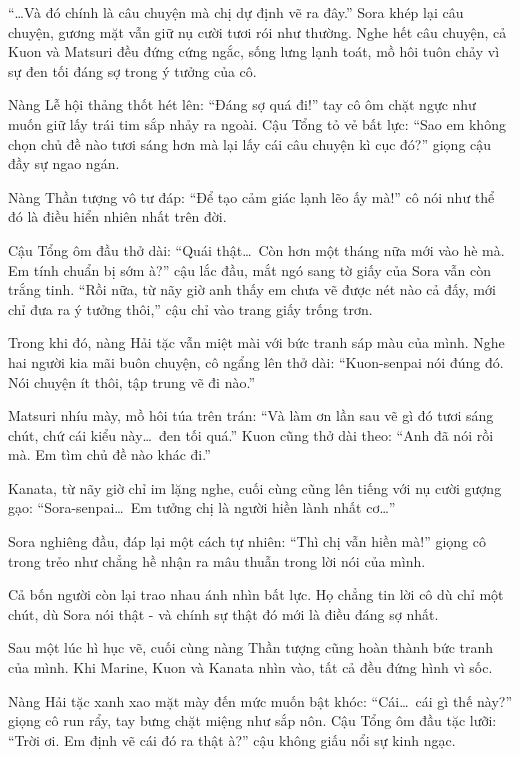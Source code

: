 \documentclass[../main.tex]{subfiles}
\begin{document}
``\dots Và đó chính là câu chuyện mà chị dự định vẽ ra đây.'' Sora khép lại câu chuyện, gương mặt vẫn giữ nụ cười tươi rói như thường. Nghe hết câu chuyện, cả Kuon và Matsuri đều đứng cứng ngắc, sống lưng lạnh toát, mồ hôi tuôn chảy vì sự đen tối đáng sợ trong ý tưởng của cô.

Nàng Lễ hội thảng thốt hét lên: ``Đáng sợ quá đi!'' tay cô ôm chặt ngực như muốn giữ lấy trái tim sắp nhảy ra ngoài. Cậu Tổng tỏ vẻ bất lực: ``Sao em không chọn chủ đề nào tươi sáng hơn mà lại lấy cái câu chuyện kì cục đó?'' giọng cậu đầy sự ngao ngán.

Nàng Thần tượng vô tư đáp: ``Để tạo cảm giác lạnh lẽo ấy mà!'' cô nói như thể đó là điều hiển nhiên nhất trên đời.

Cậu Tổng ôm đầu thở dài: ``Quái thật\dots\ Còn hơn một tháng nữa mới vào hè mà. Em tính chuẩn bị sớm à?'' cậu lắc đầu, mắt ngó sang tờ giấy của Sora vẫn còn trắng tinh. ``Rồi nữa, từ nãy giờ anh thấy em chưa vẽ được nét nào cả đấy, mới chỉ đưa ra ý tưởng thôi,'' cậu chỉ vào trang giấy trống trơn.

Trong khi đó, nàng Hải tặc vẫn miệt mài với bức tranh sáp màu của mình. Nghe hai người kia mãi buôn chuyện, cô ngẩng lên thở dài: ``Kuon-senpai nói đúng đó. Nói chuyện ít thôi, tập trung vẽ đi nào.''


Matsuri nhíu mày, mồ hôi túa trên trán: ``Và làm ơn lần sau vẽ gì đó tươi sáng chút, chứ cái kiểu này\dots\ đen tối quá.'' Kuon cũng thở dài theo: ``Anh đã nói rồi mà. Em tìm chủ đề nào khác đi.''

Kanata, từ nãy giờ chỉ im lặng nghe, cuối cùng cũng lên tiếng với nụ cười gượng gạo: ``Sora-senpai\dots\ Em tưởng chị là người hiền lành nhất cơ\dots''

Sora nghiêng đầu, đáp lại một cách tự nhiên: ``Thì chị vẫn hiền mà!'' giọng cô trong trẻo như chẳng hề nhận ra mâu thuẫn trong lời nói của mình.

Cả bốn người còn lại trao nhau ánh nhìn bất lực. Họ chẳng tin lời cô dù chỉ một chút, dù Sora nói thật - và chính sự thật đó mới là điều đáng sợ nhất.

\ct

Sau một lúc hì hục vẽ, cuối cùng nàng Thần tượng cũng hoàn thành bức tranh của mình. Khi Marine, Kuon và Kanata nhìn vào, tất cả đều đứng hình vì sốc.


Nàng Hải tặc xanh xao mặt mày đến mức muốn bật khóc: ``Cái\dots\ cái gì thế này?'' giọng cô run rẩy, tay bưng chặt miệng như sắp nôn. Cậu Tổng ôm đầu tặc lưỡi: ``Trời ơi. Em định vẽ cái đó ra thật à?'' cậu không giấu nổi sự kinh ngạc.
\end{document}
